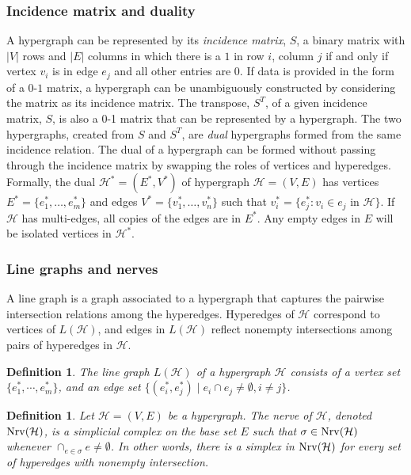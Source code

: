 \documentclass{amsart}
\newtheorem{definition}[theorem]{Definition}
\renewcommand{\H}{\mathcal{H}}
\newcommand{\Nrv}{\mm{\mathrm{Nrv}}}
\newcommand {\mm}[1]        {\ifmmode{#1}\else{\mbox{\(#1\)}}\fi}
\begin{document}
\subsubsection{Incidence matrix and duality}
A hypergraph can be represented by its \emph{incidence matrix}, $S$, a binary matrix with $|V|$ rows and $|E|$ columns in which there is a $1$ in row $i$, column $j$ if and only if vertex $v_i$ is in edge $e_j$ and all other entries are $0$.
If data is provided in the form of a $0$-$1$ matrix, a hypergraph can be unambiguously constructed by considering the matrix as its incidence matrix.
The transpose, $S^T$, of a given incidence matrix, $S$, is also a 0-1 matrix that can be represented by a hypergraph.
The two hypergraphs, created from $S$ and $S^T$, are \emph{dual} hypergraphs formed from the same incidence relation.
The dual of a hypergraph can be formed without passing through the incidence matrix by swapping the roles of vertices and hyperedges.
Formally, the dual $\H^*=(E^*, V^*)$ of hypergraph $\H=(V, E)$ has vertices $E^* = \{e_1^*, \ldots, e_m^*\}$ and edges $V^* = \{v_1^*, \ldots, v_n^*\}$ such that $v_i^* = \{e_j^* : v_i \in e_j \text{ in }\H\}$.
If $\H$ has multi-edges, all copies of the edges are in $E^*$. Any empty edges in $E$ will be isolated vertices in $\H^*$.

\subsubsection{Line graphs and nerves}
A line graph is a graph associated to a hypergraph that captures the pairwise intersection relations among the hyperedges. Hyperedges of $\H$ correspond to vertices of $L(\H)$, and edges in $L(\H)$ reflect nonempty intersections  among pairs of hyperedges in $\H$.

\begin{definition}
The \emph{line graph} $L(\H)$ of a hypergraph $\H$  consists of a vertex set $\{e^*_1, \cdots, e^*_m\}$, and an edge set $\{(e^*_i, e^*_j) \mid e_i \cap e_j \neq \emptyset, i \neq j\}$.
\end{definition}

\begin{definition}\label{def:nerve}
Let $\H=(V, E)$ be a hypergraph. The \emph{nerve} of $\H$, denoted $\Nrv(\H)$, is a simplicial complex on the base set $E$ such that $\sigma \in \Nrv(\H)$ whenever $\cap_{e \in \sigma} e \neq \emptyset$. In other words, there is a simplex in $\Nrv(\H)$ for every set of hyperedges with nonempty intersection.
\end{definition}
\end{document}
